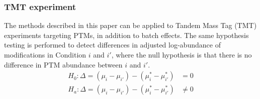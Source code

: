 \documentclass{mcp}
\begin{document}
%

\subsubsection{TMT experiment}
\label{sec:tmtmethod}

The methods described in this paper can be applied to Tandem Mass Tag (TMT) experiments targeting PTMs, in addition to batch effects. The same hypothesis testing is performed to detect differences in adjusted log-abundance of modifications in Condition $i$ and $i'$, where the null hypothesis is that there is no difference in PTM abundance between $i$ and $i'$. 
\begin{align*}
H_{0}: \Delta = (\mu_{i} - \mu_{i'}) - (\mu_{i}^{\ast} - \mu_{i'}^{\ast}) &= 0 \\
H_{a}: \Delta = (\mu_{i} - \mu_{i'}) - (\mu_{i}^{\ast} - \mu_{i'}^{\ast}) &\neq 0
\end{align*}
\end{document}
